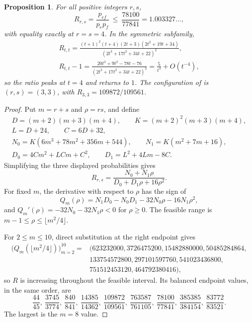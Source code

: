 \documentclass[10pt,a4paper]{amsart}
\newtheorem{proposition}[theorem]{Proposition}
\begin{document}
\begin{proposition}
\label{prop:bundle}
For all positive integers $r,s$,
\[
R_{r,s}=\frac{p_{ef}}{p_ep_f}\ \le\ \frac{78100}{77841}=1.003327\ldots,
\]
with equality exactly at $r=s=4$. In the symmetric subfamily,
\begin{gather*}
R_{t,t}=\frac{(t+1)^2(t+4)(2t+3)(2t^2+19t+34)}{(2t^3+17t^2+34t+22)^2},\\[2pt]
R_{t,t}-1=\frac{20t^3+9t^2-78t-76}{(2t^3+17t^2+34t+22)^2}=\frac5{t^3}+O(t^{-4}),
\end{gather*}
so the ratio peaks at $t=4$ and returns to $1$. The configuration of \cite{LPS}
is $(r,s)=(3,3)$, with $R_{3,3}=109872/109561$.
\end{proposition}

\begin{proof}
Put $m=r+s$ and $\rho=rs$, and define
\begin{gather*}
D=(m+2)(m+3)(m+4),\qquad
K=(m+2)^2(m+3)(m+4),\\
L=D+24,\qquad C=6D+32,\\
N_0=K(6m^3+78m^2+356m+544),\qquad
N_1=K(m^2+7m+16),\\
D_0=4Cm^2+LCm+C^2,\qquad
D_1=L^2+4Lm-8C.
\end{gather*}
Simplifying the three displayed probabilities gives
\begin{equation}
\label{eq:bundle-rho}
R_{r,s}=\frac{N_0+N_1\rho}{D_0+D_1\rho+16\rho^2}.
\end{equation}
For fixed $m$, the derivative with respect to $\rho$ has the sign of
\[
Q_m(\rho)=N_1D_0-N_0D_1-32N_0\rho-16N_1\rho^2,
\]
and $Q_m'(\rho)=-32N_0-32N_1\rho<0$ for $\rho\ge0$. The feasible range is
$m-1\le\rho\le\lfloor m^2/4\rfloor$.

For $2\le m\le10$, direct substitution at the right endpoint gives
\begin{align*}
\bigl(Q_m(\lfloor m^2/4\rfloor)\bigr)_{m=2}^{10}
={}&(623232000,3726475200,15482880000,50485284864,\\
&133754572800,297101597760,541023436800,\\
&751512453120,464792380416),
\end{align*}
so $R$ is increasing throughout the feasible interval. Its balanced endpoint
values, in the same order, are
\[
\frac{44}{45},\ \frac{3745}{3774},\ \frac{840}{841},\
\frac{14385}{14362},\ \frac{109872}{109561},\
\frac{763587}{761105},\ \frac{78100}{77841},\
\frac{385385}{384154},\ \frac{83772}{83521}.
\]
The largest is the $m=8$ value.


\end{proof}
\end{document}
